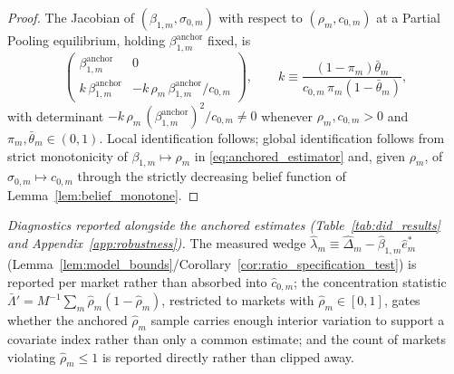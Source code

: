 \begin{proof}
The Jacobian of $(\beta_{1,m},\sigma_{0,m})$ with respect to $(\rho_m,c_{0,m})$ at a Partial
Pooling equilibrium, holding $\beta_{1,m}^{\mathrm{anchor}}$ fixed, is
\[
\begin{pmatrix}
\beta_{1,m}^{\mathrm{anchor}} & 0 \\[2pt]
k\,\beta_{1,m}^{\mathrm{anchor}} & -k\,\rho_m\,\beta_{1,m}^{\mathrm{anchor}}/c_{0,m}
\end{pmatrix},
\qquad
k\equiv\frac{(1-\pi_m)\bar\theta_m}{c_{0,m}\,\pi_m(1-\bar\theta_m)},
\]
with determinant $-k\,\rho_m\,(\beta_{1,m}^{\mathrm{anchor}})^2/c_{0,m}\ne0$ whenever
$\rho_m,c_{0,m}>0$ and $\pi_m,\bar\theta_m\in(0,1)$. Local identification follows; global
identification follows from strict monotonicity of $\beta_{1,m}\mapsto\rho_m$ in
\eqref{eq:anchored_estimator} and, given $\rho_m$, of $\sigma_{0,m}\mapsto c_{0,m}$ through the
strictly decreasing belief function of Lemma~\ref{lem:belief_monotone}.
\end{proof}

\medskip
\noindent\textit{Diagnostics reported alongside the anchored estimates
(Table~\ref{tab:did_results} and Appendix~\ref{app:robustness}).} The measured wedge
$\hat\lambda_m\equiv\hat\Delta_m-\hat\beta_{1,m}\hat e^*_m$
(Lemma~\ref{lem:model_bounds}/Corollary~\ref{cor:ratio_specification_test}) is reported per
market rather than absorbed into $\hat c_{0,m}$; the concentration statistic
$\bar\Lambda'=M^{-1}\sum_m\hat\rho_m(1-\hat\rho_m)$, restricted to markets with
$\hat\rho_m\in[0,1]$, gates whether the anchored $\hat\rho_m$ sample carries enough interior
variation to support a covariate index rather than only a common estimate; and the count of
markets violating $\hat\rho_m\le1$ is reported directly rather than clipped away.
